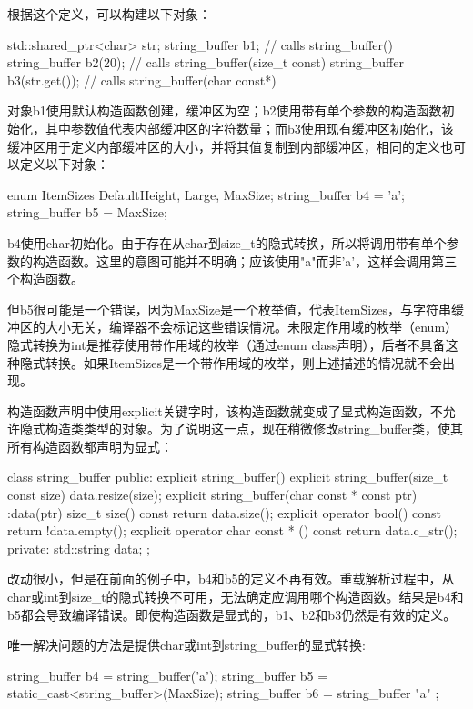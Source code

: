 根据这个定义，可以构建以下对象：

\begin{cpp}
std::shared_ptr<char> str;
string_buffer b1;            // calls string_buffer()
string_buffer b2(20);        // calls string_buffer(size_t const)
string_buffer b3(str.get()); // calls string_buffer(char const*)
\end{cpp}

对象b1使用默认构造函数创建，缓冲区为空；b2使用带有单个参数的构造函数初始化，其中参数值代表内部缓冲区的字符数量；而b3使用现有缓冲区初始化，该缓冲区用于定义内部缓冲区的大小，并将其值复制到内部缓冲区，相同的定义也可以定义以下对象：

\begin{cpp}
enum ItemSizes {DefaultHeight, Large, MaxSize};
string_buffer b4 = 'a';
string_buffer b5 = MaxSize;
\end{cpp}

b4使用char初始化。由于存在从char到size\_t的隐式转换，所以将调用带有单个参数的构造函数。这里的意图可能并不明确；应该使用"a"而非'a'，这样会调用第三个构造函数。

但b5很可能是一个错误，因为MaxSize是一个枚举值，代表ItemSizes，与字符串缓冲区的大小无关，编译器不会标记这些错误情况。未限定作用域的枚举（enum）隐式转换为int是推荐使用带作用域的枚举（通过enum class声明），后者不具备这种隐式转换。如果ItemSizes是一个带作用域的枚举，则上述描述的情况就不会出现。

构造函数声明中使用explicit关键字时，该构造函数就变成了显式构造函数，不允许隐式构造类类型的对象。为了说明这一点，现在稍微修改string\_buffer类，使其所有构造函数都声明为显式：

\begin{cpp}
class string_buffer
{
public:
    explicit string_buffer() {}
    explicit string_buffer(size_t const size) { data.resize(size); }
    explicit string_buffer(char const * const ptr) :data(ptr) {}
    size_t size() const { return data.size(); }
    explicit operator bool() const { return !data.empty(); }
    explicit operator char const * () const { return data.c_str(); }
private:
    std::string data;
};
\end{cpp}

改动很小，但是在前面的例子中，b4和b5的定义不再有效。重载解析过程中，从char或int到size\_t的隐式转换不可用，无法确定应调用哪个构造函数。结果是b4和b5都会导致编译错误。即使构造函数是显式的，b1、b2和b3仍然是有效的定义。

唯一解决问题的方法是提供char或int到string\_buffer的显式转换:

\begin{cpp}
string_buffer b4 = string_buffer('a');
string_buffer b5 = static_cast<string_buffer>(MaxSize);
string_buffer b6 = string_buffer{ "a" };
\end{cpp}

